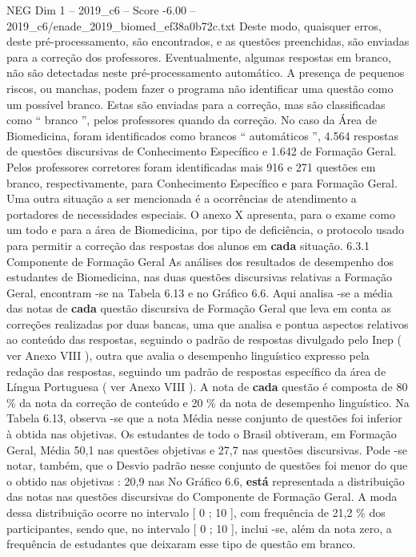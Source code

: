 \begin{textsample}{NEG Dim 1 – 2019\_c6 – Score -6.00 – 2019\_c6/enade\_2019\_biomed\_ef38a0b72c.txt}
Deste modo, quaisquer erros, deste pré-processamento, são encontrados, e as questões preenchidas, são enviadas para a correção dos professores.
Eventualmente, algumas respostas em branco, não são detectadas neste pré-processamento automático.
A presença de pequenos riscos, ou manchas, podem fazer o programa não identificar uma questão como um possível branco.
Estas são enviadas para a correção, mas são classificadas como “ branco ”, pelos professores quando da correção.
No caso da Área de Biomedicina, foram identificados como brancos “ automáticos ”, 4.564 respostas de questões discursivas de Conhecimento Específico e 1.642 de Formação Geral.
Pelos professores corretores foram identificadas mais 916 e 271 questões em branco, respectivamente, para Conhecimento Específico e para Formação Geral.
Uma outra situação a ser mencionada é a ocorrências de atendimento a portadores de necessidades especiais.
O anexo X apresenta, para o exame como um todo e para a área de Biomedicina, por tipo de deficiência, o protocolo usado para permitir a correção das respostas dos alunos em \textbf{cada} situação. 6.3.1 Componente de Formação Geral As análises dos resultados de desempenho dos estudantes de Biomedicina, nas duas questões discursivas relativas a Formação Geral, encontram -se na Tabela 6.13 e no Gráfico 6.6.
Aqui analisa -se a média das notas de \textbf{cada} questão discursiva de Formação Geral que leva em conta as correções realizadas por duas bancas, uma que analisa e pontua aspectos relativos ao conteúdo das respostas, seguindo o padrão de respostas divulgado pelo Inep ( ver Anexo VIII ), outra que avalia o desempenho linguístico expresso pela redação das respostas, seguindo um padrão de respostas específico da área de Língua Portuguesa ( ver Anexo VIII ).
A nota de \textbf{cada} questão é composta de 80 \% da nota da correção de conteúdo e 20 \% da nota de desempenho linguístico.
Na Tabela 6.13, observa -se que a nota Média nesse conjunto de questões foi inferior à obtida nas objetivas.
Os estudantes de todo o Brasil obtiveram, em Formação Geral, Média 50,1 nas questões objetivas e 27,7 nas questões discursivas.
Pode -se notar, também, que o Desvio padrão nesse conjunto de questões foi menor do que o obtido nas objetivas : 20,9 nas No Gráfico 6.6, \textbf{está} representada a distribuição das notas nas questões discursivas do Componente de Formação Geral.
A moda dessa distribuição ocorre no intervalo [ 0 ; 10 ], com frequência de 21,2 \% dos participantes, sendo que, no intervalo [ 0 ; 10 ], inclui -se, além da nota zero, a frequência de estudantes que deixaram esse tipo de questão em branco.

\end{textsample}
